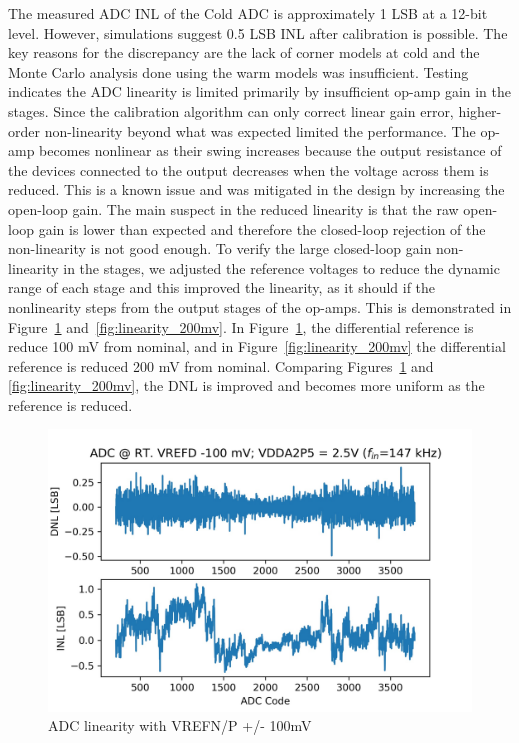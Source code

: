 \label{sec:5.3}
The measured ADC INL of the Cold ADC is approximately 1 LSB at a 12-bit level. However, simulations suggest 0.5 LSB INL after calibration is possible. The key reasons for the discrepancy are the lack of corner models at cold and the Monte Carlo analysis done using the warm models was insufficient. Testing indicates the ADC linearity is limited primarily by insufficient op-amp gain in the stages. Since the calibration algorithm can only correct linear gain error, higher-order non-linearity beyond what was expected limited the performance. The op-amp becomes nonlinear as their swing increases because the output resistance of the devices connected to the output decreases when the voltage across them is reduced. This is a known issue and was mitigated in the design by increasing the open-loop gain. The main suspect in the reduced linearity is that the raw open-loop gain is lower than expected and therefore the closed-loop rejection of the non-linearity is not good enough. To verify the large closed-loop gain non-linearity in the stages, we adjusted the reference voltages to reduce the dynamic range of each stage and this improved the linearity, as it should if the nonlinearity steps from the output stages of the op-amps. This is demonstrated in Figure~\ref{fig:linearity_100mv} and~\ref{fig:linearity_200mv}. In Figure~\ref{fig:linearity_100mv}, the differential reference is reduce 100 mV from nominal, and in Figure~\ref{fig:linearity_200mv} the differential reference is reduced 200 mV from nominal. Comparing Figures~\ref{fig:linearity_100mv} and \ref{fig:linearity_200mv}, the DNL is improved and becomes more uniform as the reference is reduced. 

\begin{figure}[h!]
\centering
  \includegraphics[width=0.7\linewidth]{figures/prakash_fig/linearity_100mv.JPG}
  \caption{ADC linearity with VREFN/P +/- 100mV}
  \label{fig:linearity_100mv}
\end{figure}

